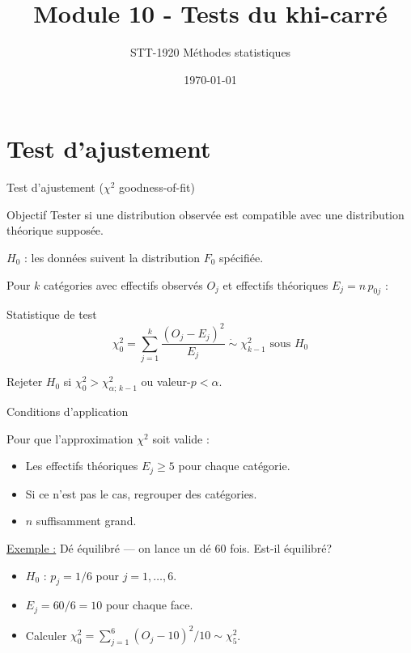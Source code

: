 \documentclass{BeamerTemplate}
\title{Module 10 - Tests du khi-carré}
\subtitle{STT-1920 Méthodes statistiques}
\date{\today}
\begin{document}
\begin{frame}[t]
  \titlepage
\end{frame}

\section{Test d'ajustement}

\begin{frame}[t]{Test d'ajustement ($\chi^2$ goodness-of-fit)}

\begin{Boite}{Objectif}
Tester si une distribution observée est compatible avec une distribution théorique supposée.
\end{Boite}

\medskip
$H_0$ : les données suivent la distribution $F_0$ spécifiée.

\bigskip
Pour $k$ catégories avec effectifs observés $O_j$ et effectifs théoriques $E_j = n\,p_{0j}$ :

\begin{Boite}{Statistique de test}
$$\chi^2_0 = \sum_{j=1}^{k} \frac{(O_j - E_j)^2}{E_j} \;\dot{\sim}\; \chi^2_{k-1} \text{ sous } H_0$$
\end{Boite}

\medskip
Rejeter $H_0$ si $\chi^2_0 > \chi^2_{\alpha;\,k-1}$ ou valeur-$p < \alpha$.

\end{frame}

\begin{frame}[t]{Conditions d'application}

Pour que l'approximation $\chi^2$ soit valide :
\begin{itemize}\itemsep5mm
  \item Les effectifs \alert{théoriques} $E_j \ge 5$ pour chaque catégorie.
  \item Si ce n'est pas le cas, regrouper des catégories.
  \item $n$ suffisamment grand.
\end{itemize}

\bigskip
\underline{Exemple :} Dé équilibré — on lance un dé 60 fois. Est-il équilibré?
\begin{itemize}
  \item $H_0$ : $p_j = 1/6$ pour $j = 1, \ldots, 6$.
  \item $E_j = 60/6 = 10$ pour chaque face.
  \item Calculer $\chi^2_0 = \sum_{j=1}^{6}(O_j-10)^2/10 \sim \chi^2_5$.
\end{itemize}

\end{frame}
\end{document}
